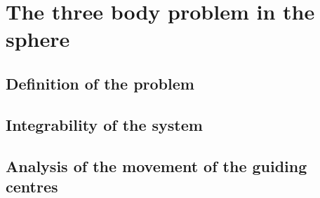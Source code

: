 \chapter{The three body problem in the sphere}

\section{Definition of the problem}


\section{Integrability of the system}


\section{Analysis of the movement of the guiding centres}


